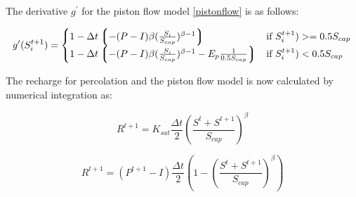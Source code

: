 The derivative $g^{\prime}$ for the piston flow model \eqref{pistonflow} is as follows:

\begin{equation}
g^{\prime} (S^{t+1}_{i}) =
\begin{cases}

1 - \Delta{t} \left\lgroup {  - (P-I) \beta (\frac{S_i}{S_{cap}}) ^ {\beta-1}  } \right\rgroup 		& \text{if } S^{t+1}_{i}) >= 0.5 S_{cap} \\

1 - \Delta{t} \left\lgroup {  - (P-I) \beta (\frac{S_i}{S_{cap}}) ^ {\beta-1}  - E_p  \frac{1}{0.5 S_{cap}} } \right\rgroup       & \text{if } S^{t+1}_{i}) < 0.5 S_{cap}
\end{cases}
\end{equation}

The recharge for percolation and the piston flow model is now calculated by numerical integration as:

\begin{equation}
R^{t+1} = K_{sat} \frac{\Delta t}{2}\left(\frac{S^t + S^{t+1}}{S_{cap}}\right)^\beta
\end{equation}

\begin{equation}
R^{t+1} = (P^{t+1}-I) \frac{\Delta t}{2}\left(1-\left(\frac{S^t + S^{t+1}}{S_{cap}}\right)^\beta\right)
\end{equation}